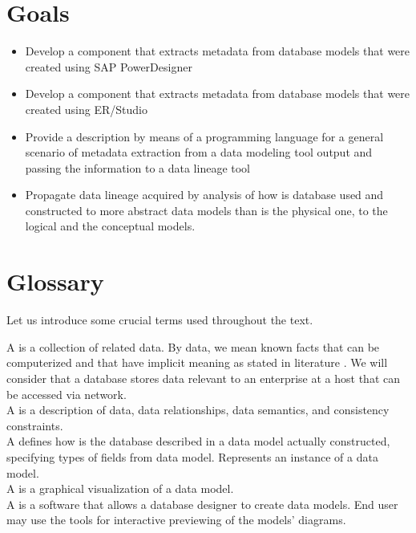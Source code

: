 \section{Goals}

\begin{itemize}
	\item Develop a component that extracts metadata from database models that were created using SAP PowerDesigner 
	\item Develop a component that extracts metadata from database models that were created using ER/Studio
	\item Provide a description by means of a programming language for a general scenario of metadata extraction from a data modeling tool output and passing the information to a data lineage tool
	\item Propagate data lineage acquired by analysis of how is database used and constructed to more abstract data models than is the physical one, to the logical and the conceptual models.
\end{itemize}

\section{Glossary}
Let us introduce some crucial terms used throughout the text.

A  is a collection of related data. By data, we mean known facts that can be computerized and that have implicit meaning as stated in literature \cite{ElmasryNavathe15}. We will consider that a database stores data relevant to an enterprise at a host that can be accessed via network. \\

A  is a description of data, data relationships, data semantics, and consistency constraints. \label{DataModel} \\
 
A  defines how is the database described in a data model actually constructed, specifying types of fields from data model. Represents an instance of a data model. \\

A  is a graphical visualization of a data model. \\

A  is a software that allows a database designer to create data models. End user may use the tools for interactive previewing of the models' diagrams. \\

